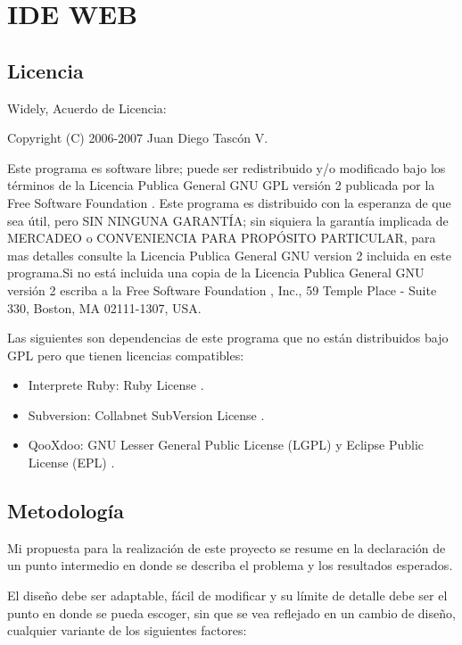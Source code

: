 \section{IDE WEB}

\subsection{Licencia}

Widely, Acuerdo de Licencia:

Copyright (C) 2006-2007 Juan Diego Tascón V.

Este programa es software libre; puede ser redistribuido y/o modificado bajo los términos de la Licencia Publica General GNU GPL versión 2 \cite{gpl} publicada por la Free Software Foundation \cite{fsf}. \newline Este programa es distribuido con la esperanza de que sea útil, pero SIN NINGUNA GARANTÍA; sin siquiera la garantía implicada de MERCADEO o CONVENIENCIA PARA PROPÓSITO PARTICULAR, para mas detalles consulte la Licencia Publica General GNU version 2 incluida en este programa.\newline Si no está incluida una copia de la Licencia Publica General GNU versión 2 \cite{gpl} escriba a la Free Software Foundation \cite{fsf}, Inc., 59 Temple Place - Suite 330, Boston, MA  02111-1307, USA.

Las siguientes son dependencias de este programa que no están distribuidos bajo GPL pero que tienen licencias compatibles:

\begin{itemize}
	\item Interprete Ruby: Ruby License \cite{ruby_lic}.
	\item Subversion: Collabnet SubVersion License \cite{svn_lic}.
	\item QooXdoo: GNU Lesser General Public License (LGPL) \cite{lgpl} y Eclipse Public License (EPL) \cite{epl}.
\end{itemize}

\subsection{Metodología}

Mi propuesta para la realización de este proyecto se resume en la declaración de un punto intermedio en donde se describa el problema y los resultados esperados.

El diseño debe ser adaptable, fácil de modificar y su límite de detalle debe ser el punto en donde se pueda escoger, sin que se vea reflejado en un cambio de diseño, cualquier variante de los siguientes factores:

